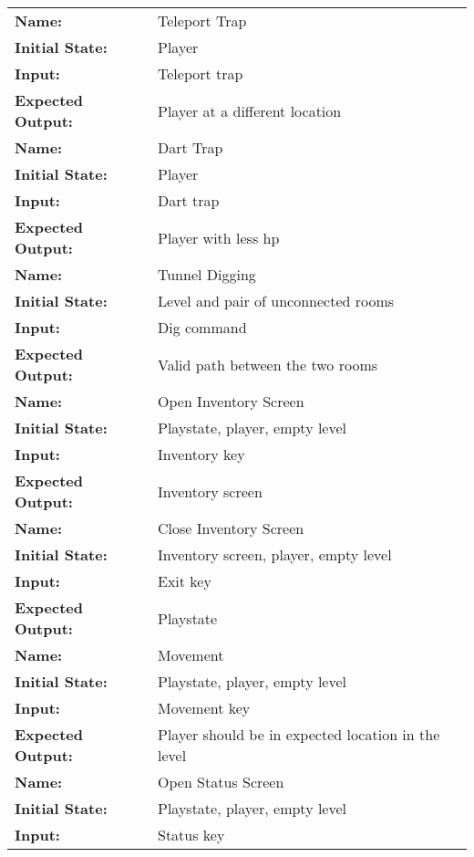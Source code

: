 \documentclass[12pt, titlepage]{article}
\begin{document}
\begin{center}
\begin{longtable}{ l | p{10cm} }
				\hline
				\rule{0pt}{1.5em}\textbf{Name:} & Teleport Trap\\
				\textbf{Initial State:} & Player\\
				\textbf{Input:} & Teleport trap\\
				\textbf{Expected Output:} & Player at a different location\\[0.6em]
				\hline
				\rule{0pt}{1.5em}\textbf{Name:} & Dart Trap\\
				\textbf{Initial State:} & Player\\
				\textbf{Input:} & Dart trap\\
				\textbf{Expected Output:} & Player with less hp\\[0.6em]
				\hline
				\rule{0pt}{1.5em}\textbf{Name:} & Tunnel Digging\\
				\textbf{Initial State:} & Level and pair of unconnected rooms\\
				\textbf{Input:} & Dig command\\
				\textbf{Expected Output:} & Valid path between the two rooms\\[0.6em]
				\hline
				\rule{0pt}{1.5em}\textbf{Name:} & Open Inventory Screen\\
				\textbf{Initial State:} & Playstate, player, empty level\\
				\textbf{Input:} & Inventory key\\
				\textbf{Expected Output:} & Inventory screen\\[0.6em]
				\hline
				\rule{0pt}{1.5em}\textbf{Name:} & Close Inventory Screen\\
				\textbf{Initial State:} & Inventory screen, player, empty level\\
				\textbf{Input:} & Exit key\\
				\textbf{Expected Output:} & Playstate\\[0.6em]
				\hline
				\rule{0pt}{1.5em}\textbf{Name:} & Movement\\
				\textbf{Initial State:} & Playstate, player, empty level\\
				\textbf{Input:} & Movement key\\
				\textbf{Expected Output:} & Player should be in expected location in the level\\[0.6em]
				\hline
				\rule{0pt}{1.5em}\textbf{Name:} & Open Status Screen\\
				\textbf{Initial State:} & Playstate, player, empty level\\
				\textbf{Input:} & Status key\\

\end{longtable}
\end{center}
\end{document}
